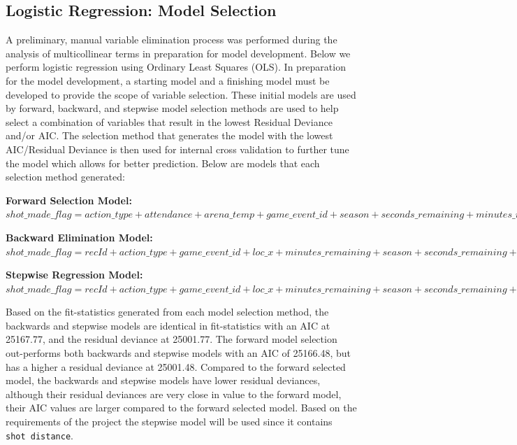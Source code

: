 \documentclass[american,]{article}
\begin{document}
\hypertarget{logistic-regression-model-selection}{%
\subsection{\texorpdfstring{\textbf{Logistic Regression: Model Selection}}{Logistic Regression: Model Selection}}\label{logistic-regression-model-selection}}

A preliminary, manual variable elimination process was performed during the analysis of multicollinear terms in preparation for model development. Below we perform logistic regression using Ordinary Least Squares (OLS). In preparation for the model development, a starting model and a finishing model must be developed to provide the scope of variable selection. These initial models are used by forward, backward, and stepwise model selection methods are used to help select a combination of variables that result in the lowest Residual Deviance and/or AIC. The selection method that generates the model with the lowest AIC/Residual Deviance is then used for internal cross validation to further tune the model which allows for better prediction. Below are models that each selection method generated:

\textbf{Forward Selection Model:}
\(shot\_made\_flag = action\_type + attendance + arena\_temp + game\_event\_id + season + seconds\_remaining + minutes\_remaining + loc\_y + game\_date + loc\_x\)

\textbf{Backward Elimination Model:}
\(shot\_made\_flag = recId + action\_type + game\_event\_id + loc\_x + minutes\_remaining + season + seconds\_remaining + shot\_distance + game\_date + shot\_id + attendance + arena\_temp\)

\textbf{Stepwise Regression Model:}
\(shot\_made\_flag = recId + action\_type + game\_event\_id + loc\_x + minutes\_remaining + season + seconds\_remaining + shot\_distance + game\_date + shot\_id + attendance + arena\_temp\)

Based on the fit-statistics generated from each model selection method, the backwards and stepwise models are identical in fit-statistics with an AIC at 25167.77, and the residual deviance at 25001.77. The forward model selection out-performs both backwards and stepwise models with an AIC of 25166.48, but has a higher a residual deviance at 25001.48. Compared to the forward selected model, the backwards and stepwise models have lower residual deviances, although their residual deviances are very close in value to the forward model, their AIC values are larger compared to the forward selected model. Based on the requirements of the project the stepwise model will be used since it contains \texttt{shot\ distance}.
\end{document}
